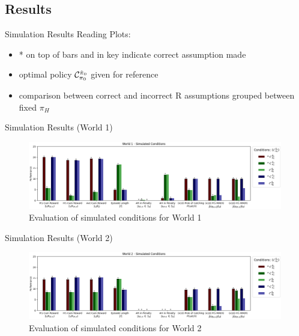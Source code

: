 \documentclass[aspectratio=1610, xcolor=dvipsnames]{packages/beamer}
\begin{document}
\subsection{Results}





\begin{frame}{Simulation Results}
    Reading Plots:
    \begin{itemize}
        \item * on top of bars and in key indicate correct assumption made
        \item optimal policy $\cond[0][0]$ given for reference %
        \item comparison between correct and incorrect R assumptions grouped between fixed $\pi_H$
    \end{itemize}
\end{frame}


\begin{frame}{Simulation Results (World 1)}
     \begin{figure} \centering
        \includegraphics[width=0.99\textwidth]{../results/policy_comparisons/Fig_AssumptionComparison_W1}
        \caption{Evaluation of simulated conditions for World 1}
        \label{fig:PolicyCompW1}
    \end{figure}
\end{frame}

\begin{frame}{Simulation Results (World 2)}
     \begin{figure} \centering
        \includegraphics[width=0.99\textwidth]{../results/policy_comparisons/Fig_AssumptionComparison_W2}
        \caption{Evaluation of simulated conditions for World 2}
        \label{fig:PolicyCompW2}
    \end{figure}
\end{frame}
\end{document}
